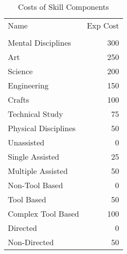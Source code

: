\begin{table}[htb]
\centering
\caption{Costs of Skill Components}
	\begin{tabular}{||l|r||} \hline
	Name                    &       Exp Cost  \\
	                        &                 \\	\hline
	Mental Disciplines      &       300       \\
	Art                     &       250       \\
	Science                 &       200       \\
	Engineering             &       150       \\
	Crafts                  &       100       \\
	Technical Study         &       75        \\
	Physical Disciplines    &       50        \\    \hline
	Unassisted              &        0        \\
	Single Assisted         &        25       \\
	Multiple Assisted       &        50       \\    \hline
	Non-Tool Based          &        0        \\
	Tool Based              &        50       \\
	Complex Tool Based      &        100      \\    \hline
	Directed                &        0        \\
	Non-Directed            &        50       \\    \hline
	\end{tabular}
\end{table}

